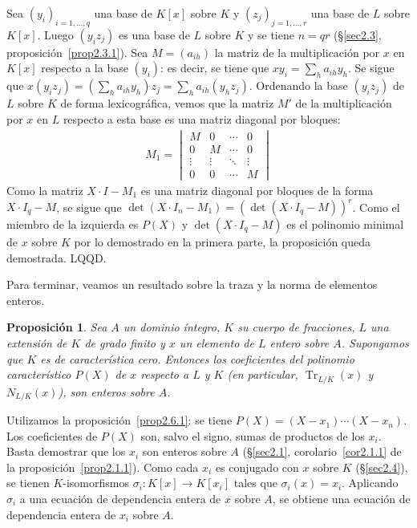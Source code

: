 \documentclass[bibtotoc,leqno,spanish]{amsbook}
\newcommand{\QED}{LQQD.}
\renewcommand{\to}[1][]{\xrightarrow{#1}}
\DeclareMathOperator{\Tr}{Tr}
\numberwithin{equation}{section}
\theoremstyle{note}
\theoremstyle{note}
\newtheorem{proposition}{Proposici\'on}
\theoremstyle{rem}
\numberwithin{theorem}{section}
\numberwithin{proposition}{section}
\numberwithin{definition}{section}
\numberwithin{lemma}{section}
\numberwithin{corollary}{section}
\numberwithin{example}{section}
\numberwithin{footnote}{section}%
\begin{document}
Sea $(y_{i})_{i=1,\dots,q}$ una base de $K[x]$ sobre $K$ y $(z_{j})_{j=1,\dots,r}$ una base de $L$ sobre $K[x]$.
Luego $(y_{i}z_{j})$ es una base de $L$ sobre $K$ y se tiene $n = qr$ (\S\ref{sec2.3}, proposici\'on~\ref{prop2.3.1}). Sea $M = (a_{ih})$ la
matriz de la multiplicaci\'on por $x$ en $K[x]$ respecto a la base $(y_{i})$: es decir, se tiene que
$xy_{i} = \sum_{h}a_{ih}y_{h}$. Se sigue que $x(y_{i}z_{j}) = \left(\sum_{h}a_{ih}y_{h}\right)z_{j}
= \sum_{h} a_{ih}(y_{h}z_{j})$. Ordenando la base $(y_{i}z_{j})$ de $L$ sobre $K$ de forma lexicogr\'afica,
vemos que la matriz $M'$ de la multiplicaci\'on por $x$ en $L$ respecto a esta base es una matriz
diagonal por bloques:
\begin{gather*}
M_{1} = \begin{vmatrix}
M & 0 & \cdots & 0\\
0 & M & \cdots & 0\\
\vdots & \vdots & \ddots & \vdots\\
0 & 0 & \cdots & M
\end{vmatrix}
\end{gather*}
Como la matriz $X\cdot I-M_{1}$ es una matriz diagonal por bloques de la forma $X\cdot I_{q}-M$, se sigue que
$\det(X\cdot I_{n}-M_{1}) = (\det(X\cdot I_{q}-M))^{r}$. Como el miembro de la izquierda es $P(X)$
y $\det(X\cdot I_{q}-M)$ es el polinomio minimal de $x$ sobre $K$ por lo demostrado en la primera parte,
la proposici\'on queda demostrada. \QED

Para terminar, veamos un resultado sobre la traza y la norma de elementos enteros.

\begin{proposition}\label{prop2.6.2}
Sea $A$ un dominio \'integro, $K$ su cuerpo de fracciones, $L$ una extensi\'on de $K$ de grado finito
y $x$ un elemento de $L$ entero sobre $A$. Supongamos que $K$ es de caracter\'istica cero. Entonces los
coeficientes del polinomio caracter\'istico $P(X)$ de $x$ respecto a $L$ y $K$ (en particular, $\Tr_{L/K}(x)$
y $N_{L/K}(x)$), son enteros sobre $A$.
\end{proposition}

Utilizamos la proposici\'on~\ref{prop2.6.1}: se tiene $P(X) = (X-x_{1})\cdots(X-x_{n})$. Los coeficientes de $P(X)$ son, salvo
el signo, sumas de productos de los $x_{i}$. Basta demostrar que los $x_{i}$ son enteros sobre $A$
(\S\ref{sec2.1}, corolario~\ref{cor2.1.1} de la proposici\'on~\ref{prop2.1.1}).
Como cada $x_{i}$ es conjugado con $x$ sobre $K$ (\S\ref{sec2.4}), se tienen
$K$-isomorfismos $\sigma_{i}:K[x]\to K[x_{i}]$ tales que $\sigma_{i}(x) = x_{i}$. Aplicando $\sigma_{i}$
a una ecuaci\'on de dependencia entera de $x$ sobre $A$, se obtiene una ecuaci\'on de dependencia
entera de $x_{i}$ sobre $A$.
\end{document}
